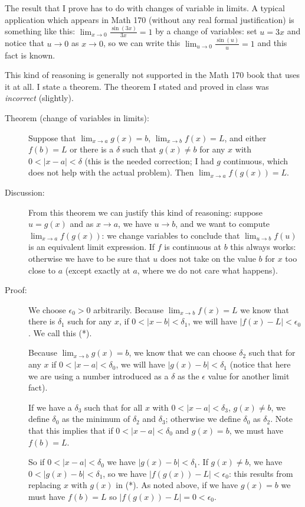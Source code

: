 \documentclass[12pt]{article}
\begin{document}
The result that I prove has to do with changes of variable in limits.  A typical application which appears in Math 170 (without any real formal justification) is something like this:  $\lim_{x \rightarrow 0}\frac{\sin(3x)}{3x} = 1$
by a change of variables:  set $u=3x$ and notice that $u \rightarrow 0$ as $x \rightarrow 0$, so we can write this $\lim_{u \rightarrow 0}\frac{\sin(u)}{u} = 1$ and this fact is known.

This kind of reasoning is generally not supported in the Math 170 book that uses it at all.  I state a theorem.  The theorem I stated and proved
in class was {\em incorrect\/} (slightly).
\newpage
\begin{description}

\item[Theorem (change of variables in limits):]  Suppose that $\lim_{x \rightarrow a}g(x)=b$, $\lim_{x \rightarrow b}f(x)=L$, and either $f(b)=L$ or there is a $\delta$ such that $g(x)\neq b$ for any $x$ with $0<|x-a|<\delta$ (this is the needed correction; I had $g$ continuous, which does not help with the actual problem).
Then $\lim_{x \rightarrow a}f(g(x))=L$.

\item[Discussion:]  From this theorem we can justify this kind of reasoning:  suppose $u=g(x)$ and as $x \rightarrow a$, we have $u \rightarrow b$, and we want to compute $\lim_{x \rightarrow a}f(g(x))$:  we change variables
to conclude that $\lim_{u \rightarrow b}f(u)$ is an equivalent limit expression.  If $f$ is continuous at $b$ this always works:  otherwise we have to be sure that $u$ does not take on the value $b$ for $x$ too close to $a$ (except exactly at $a$, where we do not care what happens).

\item[Proof:]  We choose $\epsilon_0>0$ arbitrarily.  Because $\lim_{x \rightarrow b}f(x)=L$ we know that there is $\delta_1$ such for any $x$, if $0<|x-b|<\delta_1$, we will have $|f(x)-L|<\epsilon_0$.  We call this (*).

Because $\lim_{x\rightarrow b}g(x)=b$, we know that we can choose $\delta_2$ such that for any $x$ if $0<|x-a|<\delta_0$, we will have $|g(x)-b|<\delta_1$ (notice that here we are using a number introduced as a $\delta$ as the $\epsilon$ value for another limit fact).

If we have a $\delta_3$ such that for all $x$ with $0<|x-a|<\delta_3$, $g(x)\neq b$, we define $\delta_0$ as the minimum of $\delta_2$ and $\delta_3$; otherwise we define $\delta_0$ as $\delta_2$.
Note that this implies that if $0<|x-a|<\delta_0$ and $g(x)=b$, we must have $f(b)=L$.

So if $0<|x-a|<\delta_0$ we have $|g(x)-b|<\delta_1$.  If $g(x)\neq b$, we have $0<|g(x)-b|<\delta_1$, so we have $|f(g(x))-L|<\epsilon_0$:  this results from replacing $x$ with $g(x)$ in (*).
As noted above, if we have $g(x)=b$ we must have $f(b)=L$ so $|f(g(x))-L|=0<\epsilon_0$.



\end{description}
\end{document}
